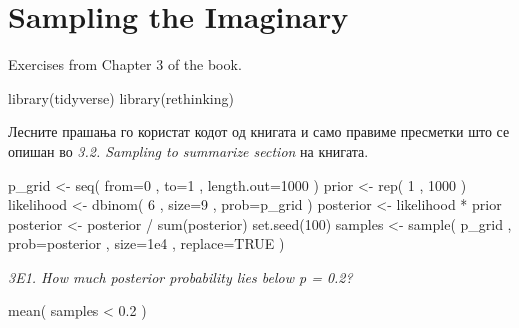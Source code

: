 \documentclass[
]{book}
\newenvironment{Shaded}{\begin{snugshade}}{\end{snugshade}}
\newcommand{\AttributeTok}[1]{\textcolor[rgb]{0.77,0.63,0.00}{#1}}
\newcommand{\ConstantTok}[1]{\textcolor[rgb]{0.00,0.00,0.00}{#1}}
\newcommand{\DecValTok}[1]{\textcolor[rgb]{0.00,0.00,0.81}{#1}}
\newcommand{\FloatTok}[1]{\textcolor[rgb]{0.00,0.00,0.81}{#1}}
\newcommand{\FunctionTok}[1]{\textcolor[rgb]{0.00,0.00,0.00}{#1}}
\newcommand{\NormalTok}[1]{#1}
\newcommand{\OtherTok}[1]{\textcolor[rgb]{0.56,0.35,0.01}{#1}}
\newcommand{\SpecialCharTok}[1]{\textcolor[rgb]{0.00,0.00,0.00}{#1}}
\begin{document}
\hypertarget{sampling-the-imaginary}{%
\chapter{Sampling the Imaginary}\label{sampling-the-imaginary}}

Exercises from Chapter 3 of the book.

\begin{Shaded}
\begin{Highlighting}[]
\FunctionTok{library}\NormalTok{(tidyverse)}
\FunctionTok{library}\NormalTok{(rethinking)}
\end{Highlighting}
\end{Shaded}

Лесните прашања го користат кодот од книгата и само правиме пресметки што се опишан во \emph{3.2. Sampling to summarize section} на книгата.

\begin{Shaded}
\begin{Highlighting}[]
\NormalTok{p\_grid }\OtherTok{\textless{}{-}} \FunctionTok{seq}\NormalTok{( }\AttributeTok{from=}\DecValTok{0}\NormalTok{ , }\AttributeTok{to=}\DecValTok{1}\NormalTok{ , }\AttributeTok{length.out=}\DecValTok{1000}\NormalTok{ )}
\NormalTok{prior }\OtherTok{\textless{}{-}} \FunctionTok{rep}\NormalTok{( }\DecValTok{1}\NormalTok{ , }\DecValTok{1000}\NormalTok{ )}
\NormalTok{likelihood }\OtherTok{\textless{}{-}} \FunctionTok{dbinom}\NormalTok{( }\DecValTok{6}\NormalTok{ , }\AttributeTok{size=}\DecValTok{9}\NormalTok{ , }\AttributeTok{prob=}\NormalTok{p\_grid )}
\NormalTok{posterior }\OtherTok{\textless{}{-}}\NormalTok{ likelihood }\SpecialCharTok{*}\NormalTok{ prior}
\NormalTok{posterior }\OtherTok{\textless{}{-}}\NormalTok{ posterior }\SpecialCharTok{/} \FunctionTok{sum}\NormalTok{(posterior)}
\FunctionTok{set.seed}\NormalTok{(}\DecValTok{100}\NormalTok{)}
\NormalTok{samples }\OtherTok{\textless{}{-}} \FunctionTok{sample}\NormalTok{( p\_grid , }\AttributeTok{prob=}\NormalTok{posterior , }\AttributeTok{size=}\FloatTok{1e4}\NormalTok{ , }\AttributeTok{replace=}\ConstantTok{TRUE}\NormalTok{ )}
\end{Highlighting}
\end{Shaded}

\emph{3E1. How much posterior probability lies below p = 0.2?}

\begin{Shaded}
\begin{Highlighting}[]
\FunctionTok{mean}\NormalTok{( samples }\SpecialCharTok{\textless{}} \FloatTok{0.2}\NormalTok{ )}
\end{Highlighting}
\end{Shaded}
\end{document}
